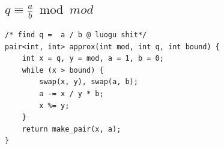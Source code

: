 \documentclass[UTF8, a4paper, titlepage, twoside]{ctexart}
\begin{document}
\subsection{\(q \equiv \frac{a}{b} \bmod mod\)}

\begin{lstlisting}[style=cpp]
/* find q =  a / b @ luogu shit*/
pair<int, int> approx(int mod, int q, int bound) {
    int x = q, y = mod, a = 1, b = 0;
    while (x > bound) {
        swap(x, y), swap(a, b);
        a -= x / y * b;
        x %= y;
    }
    return make_pair(x, a);
}

\end{lstlisting}
\end{document}
